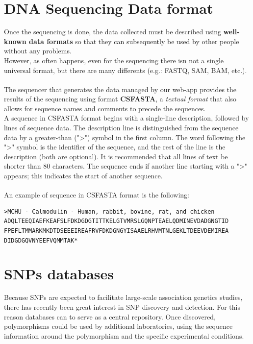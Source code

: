 \newpage


\section{DNA Sequencing Data format}

Once the sequencing is done, the data collected must be described using \textbf{well-known data formats} so that they can subsequently be used by other people without any problems.
\\ However, as often happens, even for the sequencing there isn not a single universal format, but there are many differents (e.g.: FASTQ, SAM, BAM, etc.). 
\\
\\The sequencer that generates the data managed by our web-app provides the results of the sequencing using format \textbf{CSFASTA}, a \emph{textual format} that also allows for sequence names and comments to precede the sequences.
\\A sequence in CSFASTA format begins with a single-line description, followed by lines of sequence data. The description line is distinguished from the sequence data by a greater-than (">") symbol in the first column. The word following the ">" symbol is the identifier of the sequence, and the rest of the line is the description (both are optional). It is recommended that all lines of text be shorter than 80 characters. The sequence ends if another line starting with a ">" appears; this indicates the start of another sequence.
\\
\\An example of sequence in CSFASTA format is the following:

\vspace{5mm}

\begin{lstlisting}     
>MCHU - Calmodulin - Human, rabbit, bovine, rat, and chicken
ADQLTEEQIAEFKEAFSLFDKDGDGTITTKELGTVMRSLGQNPTEAELQDMINEVDADGNGTID
FPEFLTMMARKMKDTDSEEEIREAFRVFDKDGNGYISAAELRHVMTNLGEKLTDEEVDEMIREA
DIDGDGQVNYEEFVQMMTAK*
\end{lstlisting}


\section{SNPs databases}

Because SNPs are expected to facilitate large-scale association genetics studies, there has recently been great interest in SNP discovery and detection. For this reason databases can to serve as a central repository. Once discovered, polymorphisms could be used by additional laboratories, using the sequence information around the polymorphism and the specific experimental conditions.

